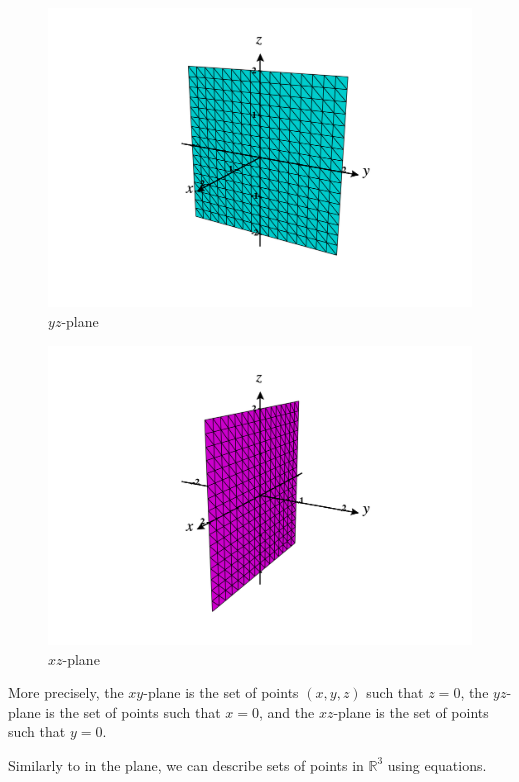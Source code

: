\documentclass{ximera}
\begin{document}
\begin{figure}[h!]
\caption{$yz$-plane}
\includegraphics[width=\textwidth]{CalcPlot3D-yz_plane}
\end{figure}

\begin{figure}[h!]
\caption{$xz$-plane}
\includegraphics[width=\textwidth]{CalcPlot3D-xz_plane}
\end{figure}

More precisely, the $xy$-plane is the set of points $(x,y,z)$ such that $z = 0$, the $yz$-plane is the set of points such that $x = 0$, and the $xz$-plane is the set of points such that $y = 0$.

Similarly to in the plane, we can describe sets of points in $\mathbb{R}^3$ using equations.
\end{document}
